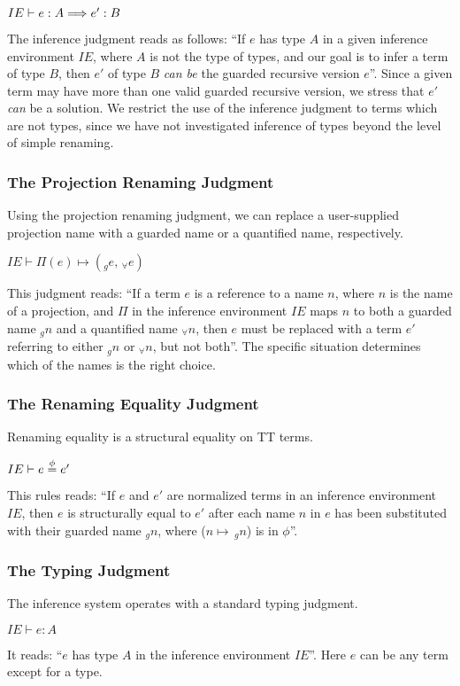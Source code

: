 \begin{center}
  ${IE\vdash e : A \Longrightarrow e' : B}$
\end{center}

The inference judgment reads as follows: ``If $e$ has type $A$ in a given
inference environment $IE$, where $A$ is not
the type of types, and our goal is to infer a term of type $B$, then
$e'$ of type $B$ \emph{can be} the guarded recursive version $e$''. Since a
given term may have more than one valid guarded recursive version, we stress
that $e'$ \emph{can} be a solution. We restrict the use of the inference
judgment to terms which are not types, since we have not investigated inference
of types beyond the level of simple renaming.
\subsubsection{The Projection Renaming Judgment}
Using the projection renaming judgment, we can replace a user-supplied
projection name with a guarded name or a quantified name, respectively.
\begin{center}
  ${IE\vdash \Pi(e) \mapsto (_ge,\,_{\forall}e)}$
\end{center}
This judgment reads: ``If a term $e$ is a
reference to a name $n$, where $n$ is the name of a projection, and $\Pi$ in the inference environment $IE$ maps $n$
to both a guarded name $_gn$ and a quantified name $_{\forall}n$, then $e$ must be replaced with a term $e'$ referring to
either $_gn$ or $_{\forall}n$, but not both''. The specific situation determines
which of the names is the right choice.

\subsubsection{The Renaming Equality Judgment}
Renaming equality is a structural equality on TT terms.
\begin{center}
  ${IE\vdash e \overset{\phi}{=} e'}$
\end{center}
This rules reads: ``If $e$ and $e'$ are normalized terms in an inference environment $IE$,
then $e$ is structurally equal to $e'$ after each name $n$ in
$e$ has been substituted with their guarded name $_gn$, where ($n\mapsto\,_gn$) is in $\phi$''.

\subsubsection{The Typing Judgment}
The inference system operates with a standard typing judgment.
\begin{center}
  ${IE\vdash e : A}$
\end{center}
It reads: ``$e$ has type $A$ in the inference
environment $IE$''. Here $e$ can be any term except for a type.

